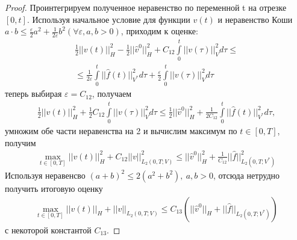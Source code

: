 \documentclass[14pt, a4paper]{extarticle}
\numberwithin{equation}{section}
\begin{document}
\begin{proof}
        Проинтегрируем полученное неравенство по переменной t на отрезке $[0, t]$. Используя
        начальное условие для функции $v(t)$ и неравенство Коши
        $a \cdot b \leq \frac{\varepsilon}{2}a^2+\frac{1}{2\varepsilon}b^2 (\forall\varepsilon,a,b > 0)$,
        приходим к оценке:
        \begin{equation*}
            \begin{gathered}
                \frac{1}{2}||v(t)||^2_H - \frac{1}{2}||\hat{v}^0||^2_H + C_{12} \int\limits_0^t ||v(\tau)||^2_V d\tau \leq \\
                \leq \frac{1}{2\varepsilon}\int\limits_0^t ||\hat{f}(t)||^2_{V^*} d\tau + \frac{\varepsilon}{2}\int\limits_0^t ||v(\tau)||^2_V d\tau
            \end{gathered}
        \end{equation*}
        \noindent теперь выбирая $\varepsilon = C_{12}$, получаем
        \begin{equation*}
            \begin{gathered}
                \frac{1}{2}||v(t)||^2_H + \frac{1}{2} C_{12} \int\limits_0^t ||v(\tau)||^2_V d\tau \leq
                \frac{1}{2}||\hat{v}^0||^2_H + \frac{1}{2C_{12}}\int\limits_0^t ||\hat{f}(t)||^2_{V^*} d\tau,
            \end{gathered}
        \end{equation*}
        \noindent умножим обе части неравенства на 2 и вычислим максимум по $t \in [0, T]$, получим
        \begin{equation*}
            \begin{gathered}
                \max_{t \in [0,T]} ||v(t)||^2_H + C_{12} ||v||^2_{L_2(0,T;V)} \leq ||\hat{v}^0||^2_H
                + \frac{1}{C_{12}} ||\hat{f}||^2_{L_2(0,T;V^*)}
            \end{gathered}
        \end{equation*}
        Используя неравенсво $(a+b)^2 \leq 2(a^2+b^2), \ a,b > 0$, отсюда нетрудно получить итоговую оценку
        \begin{equation*}
            \begin{gathered}
                \max_{t \in [0,T]} ||v(t)||_H + ||v||_{L_2(0,T;V)} \leq
                C_{13} (||\hat{v}^0||_H + ||\hat{f}||_{L_2(0,T;V^*)})
            \end{gathered}
        \end{equation*}
        с некоторой константой $C_{13}$.


\end{proof}
\end{document}
